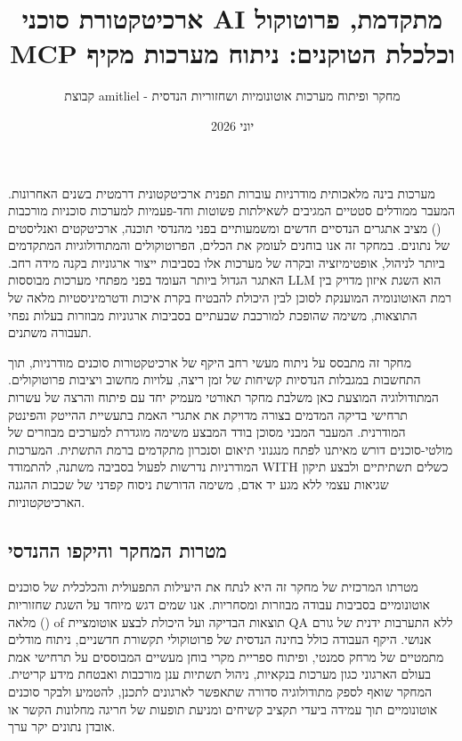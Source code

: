 \documentclass{hebrew-academic-template}
\title{ארכיטקטורת סוכני AI מתקדמת, פרוטוקול MCP וכלכלת הטוקנים: ניתוח מערכות מקיף}
\author{קבוצת amitliel - מחקר ופיתוח מערכות אוטונומיות ושחזוריות הנדסית}
\date{יוני 2026}
\begin{document}
\maketitle
\newpage

\tableofcontents
\newpage

מערכות בינה מלאכותית מודרניות עוברות תפנית ארכיטקטונית דרמטית בשנים האחרונות. המעבר ממודלים סטטיים המגיבים לשאילתות פשוטות וחד-פעמיות למערכות סוכניות מורכבות () מציב אתגרים הנדסיים חדשים ומשמעותיים בפני מהנדסי תוכנה, ארכיטקטים ואנליסטים של נתונים. במחקר זה אנו בוחנים לעומק את הכלים, הפרוטוקולים והמתודולוגיות המתקדמים ביותר לניהול, אופטימיזציה ובקרה של מערכות אלו בסביבות ייצור ארגוניות בקנה מידה רחב. האתגר הגדול ביותר העומד בפני מפתחי מערכות מבוססות LLM הוא השגת איזון מדויק בין רמת האוטונומיה המוענקת לסוכן לבין היכולת להבטיח בקרת איכות ודטרמיניסטיות מלאה של התוצאות, משימה שהופכת למורכבת שבעתיים בסביבות ארגוניות מבוזרות בעלות נפחי תעבורה משתנים. 

מחקר זה מתבסס על ניתוח מעשי רחב היקף של ארכיטקטורות סוכנים מודרניות, תוך התחשבות במגבלות הנדסיות קשיחות של זמן ריצה, עלויות מחשוב ויציבות פרוטוקולים. המתודולוגיה המוצעת כאן משלבת מחקר תאורטי מעמיק יחד עם פיתוח והרצה של עשרות תרחישי בדיקה המדמים בצורה מדויקת את אתגרי האמת בתעשיית ההייטק והפינטק המודרנית. המעבר המבני מסוכן בודד המבצע משימה מוגדרת למערכים מבוזרים של מולטי-סוכנים דורש מאיתנו לפתח מנגנוני תיאום וסנכרון מתקדמים ברמת התשתית. המערכות המודרניות נדרשות לפעול בסביבה משתנה, להתמודד WITH כשלים תשתיתיים ולבצע תיקון שגיאות עצמי ללא מגע יד אדם, משימה הדורשת ניסוח קפדני של שכבות ההגנה הארכיטקטוניות.

\subsection{מטרות המחקר והיקפו ההנדסי}
מטרתו המרכזית של מחקר זה היא לנתח את היעילות התפעולית והכלכלית של סוכנים אוטונומיים בסביבות עבודה מבוזרות ומסחריות. אנו שמים דגש מיוחד על השגת שחזוריות מלאה () of תוצאות הבדיקה ועל היכולת לבצע אוטומציית QA ללא התערבות ידנית של גורם אנושי. היקף העבודה כולל בחינה הנדסית של פרוטוקולי תקשורת חדשניים, ניתוח מודלים מתמטיים של מרחק סמנטי, ופיתוח ספריית מקרי בוחן מעשיים המבוססים על תרחישי אמת בעולם הארגוני כגון מערכות בנקאיות, ניהול תשתיות ענן מורכבות ואבטחת מידע קריטית. המחקר שואף לספק מתודולוגיה סדורה שתאפשר לארגונים לתכנן, להטמיע ולבקר סוכנים אוטונומיים תוך עמידה ביעדי תקציב קשיחים ומניעת תופעות של חריגה מחלונות הקשר או אובדן נתונים יקר ערך.
\end{document}
